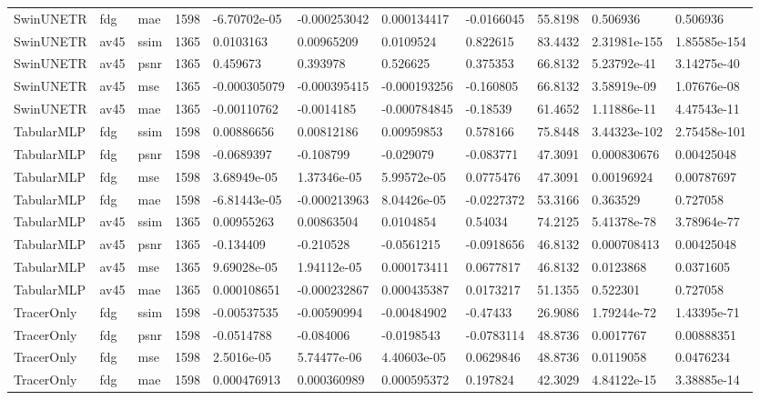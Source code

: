 \documentclass{article}
\begin{document}
\begin{landscape}
\begin{longtable}{lllllllllll}
SwinUNETR & fdg & mae & 1598 & -6.70702e-05 & -0.000253042 & 0.000134417 & -0.0166045 & 55.8198 & 0.506936 & 0.506936 \\
SwinUNETR & av45 & ssim & 1365 & 0.0103163 & 0.00965209 & 0.0109524 & 0.822615 & 83.4432 & 2.31981e-155 & 1.85585e-154 \\
SwinUNETR & av45 & psnr & 1365 & 0.459673 & 0.393978 & 0.526625 & 0.375353 & 66.8132 & 5.23792e-41 & 3.14275e-40 \\
SwinUNETR & av45 & mse & 1365 & -0.000305079 & -0.000395415 & -0.000193256 & -0.160805 & 66.8132 & 3.58919e-09 & 1.07676e-08 \\
SwinUNETR & av45 & mae & 1365 & -0.00110762 & -0.0014185 & -0.000784845 & -0.18539 & 61.4652 & 1.11886e-11 & 4.47543e-11 \\
TabularMLP & fdg & ssim & 1598 & 0.00886656 & 0.00812186 & 0.00959853 & 0.578166 & 75.8448 & 3.44323e-102 & 2.75458e-101 \\
TabularMLP & fdg & psnr & 1598 & -0.0689397 & -0.108799 & -0.029079 & -0.083771 & 47.3091 & 0.000830676 & 0.00425048 \\
TabularMLP & fdg & mse & 1598 & 3.68949e-05 & 1.37346e-05 & 5.99572e-05 & 0.0775476 & 47.3091 & 0.00196924 & 0.00787697 \\
TabularMLP & fdg & mae & 1598 & -6.81443e-05 & -0.000213963 & 8.04426e-05 & -0.0227372 & 53.3166 & 0.363529 & 0.727058 \\
TabularMLP & av45 & ssim & 1365 & 0.00955263 & 0.00863504 & 0.0104854 & 0.54034 & 74.2125 & 5.41378e-78 & 3.78964e-77 \\
TabularMLP & av45 & psnr & 1365 & -0.134409 & -0.210528 & -0.0561215 & -0.0918656 & 46.8132 & 0.000708413 & 0.00425048 \\
TabularMLP & av45 & mse & 1365 & 9.69028e-05 & 1.94112e-05 & 0.000173411 & 0.0677817 & 46.8132 & 0.0123868 & 0.0371605 \\
TabularMLP & av45 & mae & 1365 & 0.000108651 & -0.000232867 & 0.000435387 & 0.0173217 & 51.1355 & 0.522301 & 0.727058 \\
TracerOnly & fdg & ssim & 1598 & -0.00537535 & -0.00590994 & -0.00484902 & -0.47433 & 26.9086 & 1.79244e-72 & 1.43395e-71 \\
TracerOnly & fdg & psnr & 1598 & -0.0514788 & -0.084006 & -0.0198543 & -0.0783114 & 48.8736 & 0.0017767 & 0.00888351 \\
TracerOnly & fdg & mse & 1598 & 2.5016e-05 & 5.74477e-06 & 4.40603e-05 & 0.0629846 & 48.8736 & 0.0119058 & 0.0476234 \\
TracerOnly & fdg & mae & 1598 & 0.000476913 & 0.000360989 & 0.000595372 & 0.197824 & 42.3029 & 4.84122e-15 & 3.38885e-14 \\

\end{longtable}
\end{landscape}
\end{document}
